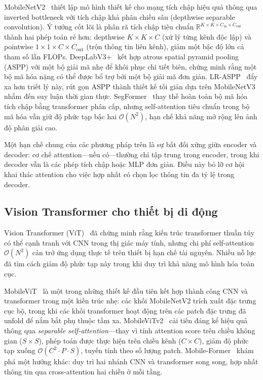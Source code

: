 \documentclass[conference]{IEEEtran}
\begin{document}
MobileNetV2~\cite{b6} thiết lập mô hình thiết kế cho mạng tích chập hiệu quả thông qua inverted bottleneck với tích chập khả phân chiều sâu (depthwise separable convolution). Ý tưởng cốt lõi là phân rã tích chập tiêu chuẩn $\mathbb{R}^{K \times K \times C_{\text{in}} \times C_{\text{out}}}$ thành hai phép toán rẻ hơn: depthwise $K \times K \times C$ (xử lý từng kênh độc lập) và pointwise $1 \times 1 \times C \times C_{\text{out}}$ (trộn thông tin liên kênh), giảm một bậc độ lớn cả tham số lẫn FLOPs. DeepLabV3+~\cite{b7} kết hợp atrous spatial pyramid pooling (ASPP) với một bộ giải mã nhẹ để khôi phục chi tiết biên, chứng minh rằng một bộ mã hóa nặng có thể được bổ trợ bởi một bộ giải mã đơn giản. LR-ASPP~\cite{b19} đẩy xa hơn triết lý này, rút gọn ASPP thành thiết kế tối giản dựa trên MobileNetV3 nhắm đến suy luận thời gian thực. SegFormer~\cite{b8} thay thế hoàn toàn bộ mã hóa tích chập bằng transformer phân cấp, nhưng self-attention tiêu chuẩn trong bộ mã hóa vẫn giữ độ phức tạp bậc hai $\mathcal{O}(N^2)$, hạn chế khả năng mở rộng lên ảnh độ phân giải cao.

Một hạn chế chung của các phương pháp trên là sự bất đối xứng giữa encoder và decoder: cơ chế attention---nếu có---thường chỉ tập trung trong encoder, trong khi decoder vẫn là các phép tích chập hoặc MLP đơn giản. Điều này bỏ lỡ cơ hội khai thác attention cho việc hợp nhất có chọn lọc thông tin đa tỷ lệ trong decoder.

\subsection{Vision Transformer cho thiết bị di động}

Vision Transformer (ViT)~\cite{b2} đã chứng minh rằng kiến trúc transformer thuần túy có thể cạnh tranh với CNN trong thị giác máy tính, nhưng chi phí self-attention $\mathcal{O}(N^2)$ cản trở ứng dụng thực tế trên thiết bị hạn chế tài nguyên. Nhiều nỗ lực đã tìm cách giảm độ phức tạp này trong khi duy trì khả năng mô hình hóa toàn cục.

MobileViT~\cite{b9} là một trong những thiết kế đầu tiên kết hợp thành công CNN và transformer trong một kiến trúc nhẹ: các khối MobileNetV2 trích xuất đặc trưng cục bộ, trong khi các khối transformer hoạt động trên các patch đặc trưng đã unfold để nắm bắt phụ thuộc tầm xa. MobileViTv2~\cite{b3} cải tiến đáng kể hiệu quả thông qua \textit{separable self-attention}---thay vì tính attention score trên chiều không gian ($S \times S$), phép toán được thực hiện trên chiều kênh ($C \times C$), giảm độ phức tạp xuống $\mathcal{O}(C^2 \cdot P \cdot S)$, tuyến tính theo số lượng patch. Mobile-Former~\cite{b10} khám phá một hướng khác: duy trì hai nhánh CNN và transformer song song, hợp nhất thông tin qua cross-attention hai chiều ở mỗi tầng.
\end{document}
